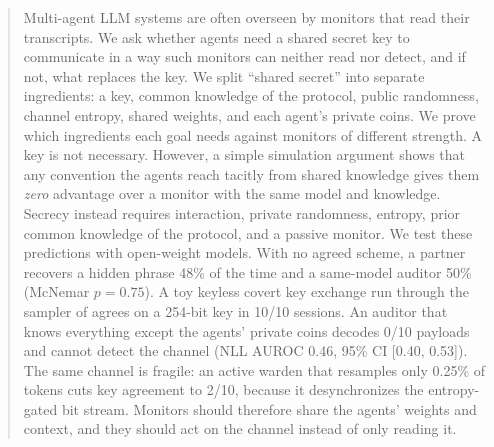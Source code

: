 \begin{abstract}
Multi-agent LLM systems are often overseen by monitors that read their transcripts. We ask whether agents need a shared secret key to communicate in a way such monitors can neither read nor detect, and if not, what replaces the key. We split ``shared secret'' into separate ingredients: a key, common knowledge of the protocol, public randomness, channel entropy, shared weights, and each agent's private coins. We prove which ingredients each goal needs against monitors of different strength. A key is not necessary. However, a simple simulation argument shows that any convention the agents reach tacitly from shared knowledge gives them \emph{zero} advantage over a monitor with the same model and knowledge. Secrecy instead requires interaction, private randomness, entropy, prior common knowledge of the protocol, and a passive monitor. We test these predictions with open-weight models. With no agreed scheme, a \qwenbig partner recovers a hidden phrase 48\% of the time and a same-model auditor 50\% (McNemar $p=0.75$). A toy keyless covert key exchange run through the sampler of \qwenchan agrees on a 254-bit key in 10/10 sessions. An auditor that knows everything except the agents' private coins decodes 0/10 payloads and cannot detect the channel (NLL AUROC 0.46, 95\% CI [0.40, 0.53]). The same channel is fragile: an active warden that resamples only 0.25\% of tokens cuts key agreement to 2/10, because it desynchronizes the entropy-gated bit stream. Monitors should therefore share the agents' weights and context, and they should act on the channel instead of only reading it.
\end{abstract}
